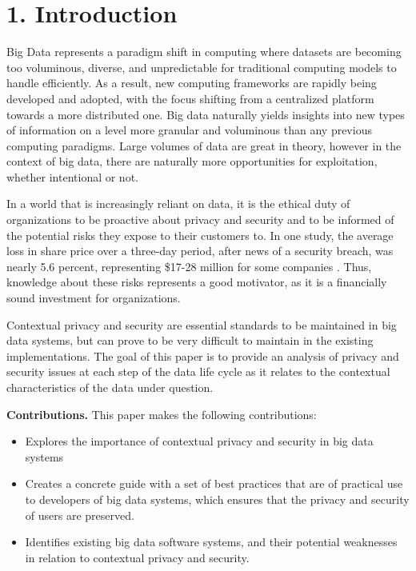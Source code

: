 \documentclass{sigchi}
\begin{document}

\section{1. Introduction}

Big Data represents a paradigm shift in computing where datasets are becoming too voluminous, diverse, and unpredictable for traditional computing models to handle efficiently. As a result, new computing frameworks are rapidly being developed and adopted, with the focus shifting from a centralized platform towards a more distributed one. Big data naturally yields insights into new types of information on a level more granular and voluminous than any previous computing paradigms. Large volumes of data are great in theory, however in the context of big data, there are naturally more opportunities for exploitation, whether intentional or not. 

In a world that is increasingly reliant on data, it is the ethical duty of organizations to be proactive about privacy and security and to be informed of the potential risks they expose to their customers to. In one study, the average loss in share price over a three-day period, after news of a security breach, was nearly 5.6 percent, representing \$17-28 million for some companies \cite{garg2003quantifying}. Thus, knowledge about these risks represents a good motivator, as it is a financially sound investment for organizations.

Contextual privacy and security are essential standards to be maintained in big data systems, but can prove to be very difficult to maintain in the existing implementations. The goal of this paper is to provide an analysis of privacy and security issues at each step of the data life cycle as it relates to the contextual characteristics of the data under question.

\textbf{Contributions.} This paper makes the following contributions:
\begin{itemize}
  \item Explores the importance of contextual privacy and security in big data systems
  \item Creates a concrete guide with a set of best practices that are of practical use to developers of big data systems, which ensures that the privacy and security of users are preserved.
  \item Identifies existing big data software systems, and their potential weaknesses in relation to contextual privacy and security.
\end{itemize}
\end{document}
